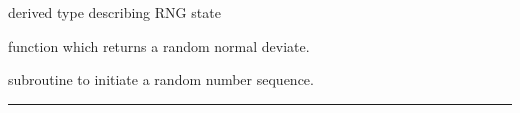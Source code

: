 \begin{related}
  \begin{sulist}{} %
  \item[\htmlref{planck\_rng}{sub:planck_rng}] derived type describing RNG state
  \item[\htmlref{rand\_gauss}{sub:rand_gauss}] function which returns a  random normal deviate.
  \item[\htmlref{rand\_init}{sub:rand_init}] subroutine to initiate a random number sequence. 
  \end{sulist}
\end{related}

\rule{\hsize}{2mm}

\newpage
